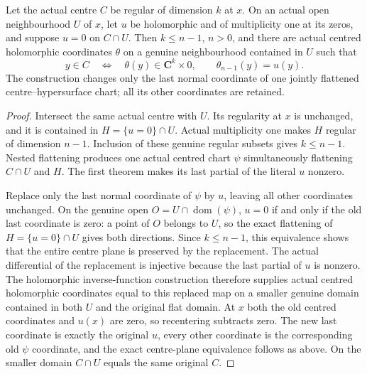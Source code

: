 \begin{theorem}
\label{hir:actual-centre-contact-joint-coordinates}
\leanok
Let the actual centre $C$ be regular of dimension $k$ at $x$. On an actual open neighbourhood $U$ of $x$, let $u$ be holomorphic and of multiplicity one at its zeros, and suppose $u=0$ on $C\cap U$. Then $k\le n-1$, $n>0$, and there are actual centred holomorphic coordinates $\theta$ on a genuine neighbourhood contained in $U$ such that
\[
 y\in C\quad\Longleftrightarrow\quad\theta(y)\in\mathbf C^k\times0,
 \qquad \theta_{n-1}(y)=u(y).
\]
The construction changes only the last normal coordinate of one jointly flattened centre--hypersurface chart; all its other coordinates are retained.
\end{theorem}
\begin{proof}
Intersect the same actual centre with $U$. Its regularity at $x$ is unchanged, and it is contained in $H=\{u=0\}\cap U$. Actual multiplicity one makes $H$ regular of dimension $n-1$. Inclusion of these genuine regular subsets gives $k\le n-1$. Nested flattening produces one actual centred chart $\psi$ simultaneously flattening $C\cap U$ and $H$. The first theorem makes its last partial of the literal $u$ nonzero.

Replace only the last normal coordinate of $\psi$ by $u$, leaving all other coordinates unchanged. On the genuine open $O=U\cap\operatorname{dom}(\psi)$, $u=0$ if and only if the old last coordinate is zero: a point of $O$ belongs to $U$, so the exact flattening of $H=\{u=0\}\cap U$ gives both directions. Since $k\le n-1$, this equivalence shows that the entire centre plane is preserved by the replacement. The actual differential of the replacement is injective because the last partial of $u$ is nonzero. The holomorphic inverse-function construction therefore supplies actual centred holomorphic coordinates equal to this replaced map on a smaller genuine domain contained in both $U$ and the original flat domain. At $x$ both the old centred coordinates and $u(x)$ are zero, so recentering subtracts zero. The new last coordinate is exactly the original $u$, every other coordinate is the corresponding old $\psi$ coordinate, and the exact centre-plane equivalence follows as above. On the smaller domain $C\cap U$ equals the same original $C$.
\end{proof}

